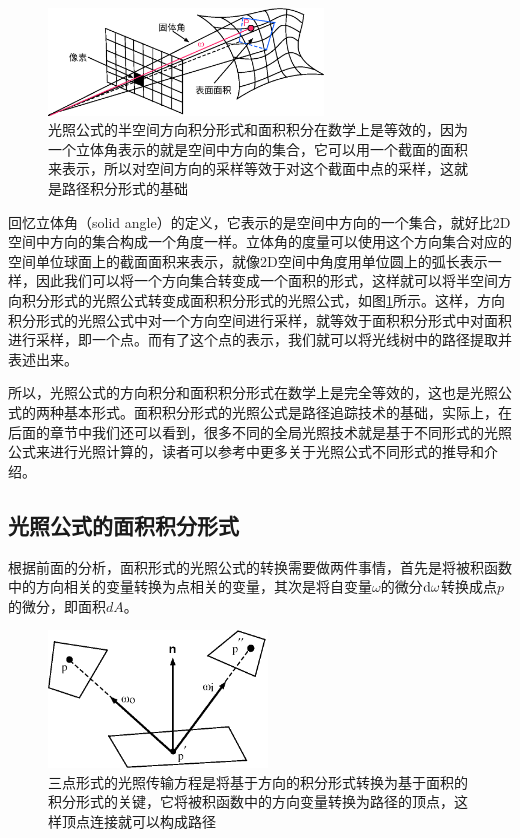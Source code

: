 \begin{figure}
	\sidecaption
	\includegraphics[width=0.65\textwidth]{figures/pt/solid-angle-to-surface}
	\caption{光照公式的半空间方向积分形式和面积积分在数学上是等效的，因为一个立体角表示的就是空间中方向的集合，它可以用一个截面的面积来表示，所以对空间方向的采样等效于对这个截面中点的采样，这就是路径积分形式的基础}
	\label{f:pt-solid-angle-to-surface}
\end{figure}

回忆立体角（solid angle）的定义，它表示的是空间中方向的一个集合，就好比2D空间中方向的集合构成一个角度一样。立体角的度量可以使用这个方向集合对应的空间单位球面上的截面面积来表示，就像2D空间中角度用单位圆上的弧长表示一样，因此我们可以将一个方向集合转变成一个面积的形式，这样就可以将半空间方向积分形式的光照公式转变成面积积分形式的光照公式，如图\ref{f:pt-solid-angle-to-surface}所示。这样，方向积分形式的光照公式中对一个方向空间进行采样，就等效于面积积分形式中对面积进行采样，即一个点。而有了这个点的表示，我们就可以将光线树中的路径提取并表述出来。

所以，光照公式的方向积分和面积积分形式在数学上是完全等效的，这也是光照公式的两种基本形式。面积积分形式的光照公式是路径追踪技术的基础，实际上，在后面的章节中我们还可以看到，很多不同的全局光照技术就是基于不同形式的光照公式来进行光照计算的，读者可以参考\cite{b:AdvancedGlobalIllumination}中更多关于光照公式不同形式的推导和介绍。






\subsection{光照公式的面积积分形式}
根据前面的分析，面积形式的光照公式的转换需要做两件事情，首先是将被积函数中的方向相关的变量转换为点相关的变量，其次是将自变量$\omega$的微分${\rm d}\omega$转换成点$p$的微分，即面积$dA$。

\begin{figure}
	\sidecaption
	\includegraphics[width=0.52\textwidth]{figures/pt/three-point-form}
	\caption{三点形式的光照传输方程是将基于方向的积分形式转换为基于面积的积分形式的关键，它将被积函数中的方向变量转换为路径的顶点，这样顶点连接就可以构成路径}
	\label{f:pt-three-point-form}
\end{figure}

